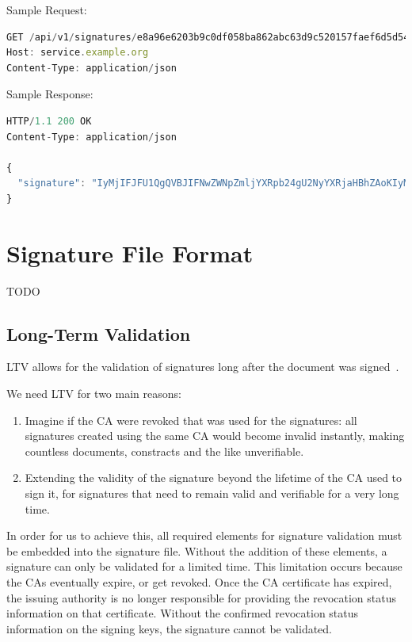 Sample Request:

\begin{lstlisting}[caption={signature request}, captionpos=b, language=JavaScript, label={lst:signaturerequest}]
GET /api/v1/signatures/e8a96e6203b9c0df058ba862abc63d9c520157faef6d5d54e54e526b0a85b2be HTTP/1.
Host: service.example.org
Content-Type: application/json
\end{lstlisting}

Sample Response:

\begin{lstlisting}[caption={signature response}, captionpos=b, language=JavaScript, label={lst:signatureresponse}]
HTTP/1.1 200 OK
Content-Type: application/json

{
  "signature": "IyMjIFJFU1QgQVBJIFNwZWNpZmljYXRpb24gU2NyYXRjaHBhZAoKIyMjIyBQcmUtQXV0aCBlbmRw...b2ludCAKIyMjIyMgRW5kcG9pbnQKYGBgUE9TVCAvYXBpL3YxL3NpZ25gYGAK"
}
\end{lstlisting}

\section{Signature File Format}
TODO
\subsection{Long-Term Validation}
\gls{LTV} allows for the validation of signatures long after the document was signed~\cite{etsipades}.

We need \gls{LTV} for two main reasons:
\begin{enumerate}
    \item Imagine if the \gls{CA} were revoked that was used for the signatures: all signatures created using the same \gls{CA} would become invalid instantly, making countless documents, constracts and the like unverifiable.
    \item Extending the validity of the signature beyond the lifetime of the \gls{CA} used to sign it, for signatures that need to remain valid and verifiable for a very long time.
\end{enumerate}
In order for us to achieve this, all required elements for signature validation must be embedded into the signature file.
Without the addition of these elements, a signature can only be validated for a limited time.
This limitation occurs because the \gls{CA}s eventually expire, or get revoked.
Once the \gls{CA} certificate has expired, the issuing authority is no longer responsible for providing the revocation status information on that certificate.
Without the confirmed revocation status information on the signing keys, the signature cannot be validated.

